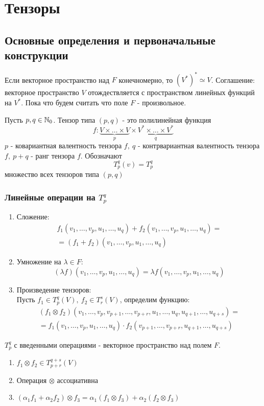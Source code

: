\section{Тензоры}
\subsection{Основные определения и первоначальные конструкции}
Если векторное пространство над $F$ конечномерно, то $(V^*)^*\simeq V$. Соглашение: векторное пространство $V$ отождествляется с пространством линейных функций на $V^*$.
Пока что будем считать что поле $F$ - произвольное.
\begin{definition}
    Пусть $p,q\in \mathbb{N}_0$. Тензор типа $(p,q)$ - это полилинейная функция 
    \[f: \underbrace{V\times \dots\times V}_p \times \underbrace{V^*\times \dots\times V^*}_q \]
    $p$ - ковариантная валентность тензора $f,\ q$ - контрвариантная валентность тензора $f,\ p+q$ - ранг тензора $f$. 
    Обозначают 
    \[T^q_p(v)=T^q_p\]
    множество всех тензоров типа $(p,q)$
\end{definition} 
\subsubsection*{Линейные операции на $T^q_p$}
\begin{enumerate}
    \item Сложение: 
    \begin{multline*}
        f_1(v_1,\dots,v_p,u_1,\dots,u_q)+f_2(v_1,\dots,v_p,u_1,\dots,u_q)=\\
        =(f_1+f_2)(v_1,\dots,v_p,u_1,\dots,u_q)
    \end{multline*}
    \item Умножение на $\lambda\in F$:
    \[(\lambda f)(v_1,\dots,v_p,u_1,\dots,u_q)=\lambda f(v_1,\dots,v_p,u_1,\dots,u_q)\] 
    \item Произведение тензоров:\\
    Пусть $f_1\in T_p^q(V),\ f_2\in T_r^s(V)$, определим функцию:
    \begin{multline*}
        (f_1\otimes f_2)(v_1,\dots,v_p,v_{p+1},\dots,v_{p+r},u_1,\dots,u_q,u_{q+1},\dots,u_{q+s})=\\
        =f_1(v_1,\dots,v_p,u_1,\dots,u_q)\cdot f_2(v_{p+1},\dots,v_{p+r},u_{q+1},\dots,u_{q+s})
    \end{multline*}
\end{enumerate}
\begin{subtheorem}
    $T_p^q$ с введенными операциями - векторное пространство над полем $F$.
\end{subtheorem}
\begin{subtheorem}
    \begin{enumerate}
        \item $f_1\otimes f_2\in T_{p+r}^{q+s}(V)$
        \item Операция $\otimes$ ассоциативна
        \item $(\alpha_1f_1+\alpha_2f_2)\otimes f_3=\alpha_1(f_1\otimes f_3)+\alpha_2(f_2\otimes f_3)$ %
    \end{enumerate}
\end{subtheorem}
